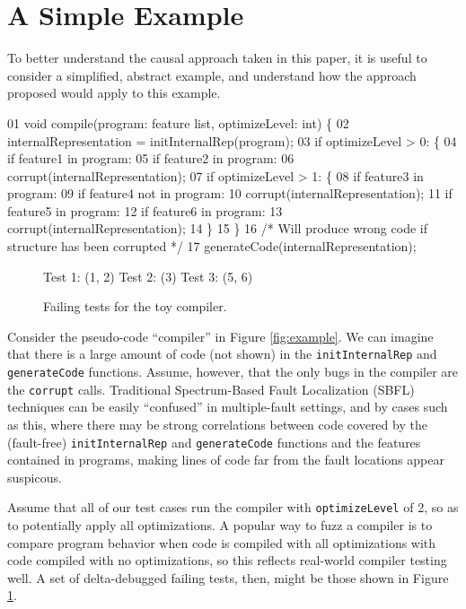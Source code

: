 \section{A Simple Example}
\label{sec:example}

To better understand the causal approach taken in this paper, it is useful to consider a simplified, abstract example, and understand how the approach proposed would apply to this example.

\begin{figure*}
\begin{code}
 01  void compile(program: feature list, optimizeLevel: int) \{
 02    internalRepresentation = initInternalRep(program);
 03    if optimizeLevel > 0: \{
 04       if feature1 in program:
 05          if feature2 in program:
 06             corrupt(internalRepresentation);
 07       if optimizeLevel > 1: \{
 08          if feature3 in program:
 09             if feature4 not in program:
 10                corrupt(internalRepresentation);
 11          if feature5 in program:
 12             if feature6 in program:
 13                corrupt(internalRepresentation);
 14       \}
 15    \}
 16    /* Will produce wrong code if structure has been corrupted */
 17    generateCode(internalRepresentation);
\end{code}
\caption{A toy ``optimizing compiler'' with multiple bugs}
\label{fig:example}
\end{figure*}

\begin{figure}
\begin{code}
Test 1:  (1, 2)
Test 2:  (3)
Test 3:  (5, 6)
\end{code}
\caption{Failing tests for the toy compiler.}
\label{fig:toybugs}
\end{figure}

Consider the pseudo-code ``compiler'' in Figure \ref{fig:example}.  We can imagine that there is a large amount of code (not shown) in the {\tt initInternalRep} and {\tt generateCode} functions.  Assume, however, that the only bugs in the compiler are the {\tt corrupt} calls.  Traditional Spectrum-Based Fault Localization (SBFL) techniques can be easily ``confused'' in multiple-fault settings, and by cases such as this, where there may be strong correlations between code covered by the (fault-free) {\tt initInternalRep} and {\tt generateCode} functions and the features contained in programs, making lines of code far from the fault locations appear suspicous.

Assume that all of our test cases run the compiler with {\tt optimizeLevel} of 2, so as to potentially apply all optimizations.  A popular way to fuzz a compiler is to compare program behavior when code is compiled with all optimizations with code compiled with no optimizations, so this reflects real-world compiler testing well.  A set of delta-debugged failing tests, then, might be those shown in Figure \ref{fig:toybugs}.

